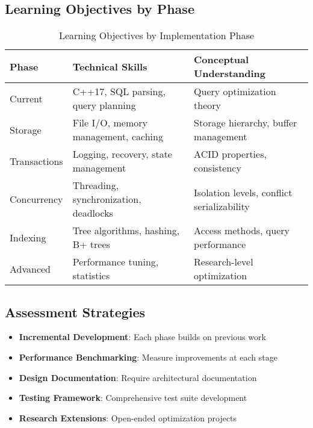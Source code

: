\documentclass[12pt,a4paper]{article}
\begin{document}
    \subsection{Learning Objectives by Phase}

    \begin{table}[htbp]
        \centering
        \caption{Learning Objectives by Implementation Phase}
        \label{tab:learning}
        \begin{tabular}{p{2cm}p{5cm}p{5cm}}
            \toprule
            \textbf{Phase} & \textbf{Technical Skills} & \textbf{Conceptual Understanding} \\
            \midrule
            Current & C++17, SQL parsing, query planning & Query optimization theory \\
            Storage & File I/O, memory management, caching & Storage hierarchy, buffer management \\
            Transactions & Logging, recovery, state management & ACID properties, consistency \\
            Concurrency & Threading, synchronization, deadlocks & Isolation levels, conflict serializability \\
            Indexing & Tree algorithms, hashing, B+ trees & Access methods, query performance \\
            Advanced & Performance tuning, statistics & Research-level optimization \\
            \bottomrule
        \end{tabular}
    \end{table}

    \subsection{Assessment Strategies}

    \begin{itemize}
        \item \textbf{Incremental Development}: Each phase builds on previous work
        \item \textbf{Performance Benchmarking}: Measure improvements at each stage
        \item \textbf{Design Documentation}: Require architectural documentation
        \item \textbf{Testing Framework}: Comprehensive test suite development
        \item \textbf{Research Extensions}: Open-ended optimization projects
    \end{itemize}
\end{document}
